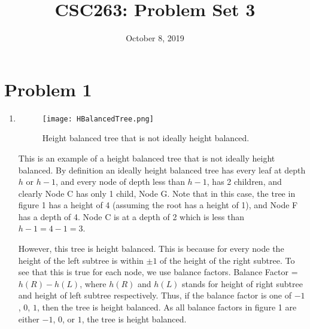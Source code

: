 \documentclass{article}
\title{CSC263: Problem Set 3}
\date{October 8, 2019}
\begin{document}
\maketitle

\section{Problem 1}

\begin{enumerate}[label=(\alph*)]

\item \begin{figure}[htp]
    \centering
    \texttt{[image: HBalancedTree.png]}
    \caption{Height balanced tree that is not ideally height balanced.}
    \label{fig:tree}
\end{figure}

This is an example of a height balanced tree that is not ideally height balanced. By definition an ideally height balanced tree has every leaf at depth $h$ or $h-1$, and every node of depth less than $h-1$, has 2 children, and clearly Node C has only 1 child, Node G. Note that in this case, the tree in figure 1 has a height of 4 (assuming the root has a height of 1), and Node F has a depth of 4. Node C is at a depth of 2 which is less than $h - 1 = 4 - 1 = 3$. 

However, this tree is height balanced. This is because for every node the height of the left subtree is within $\pm 1$ of the height of the right subtree. To see that this is true for each node, we use balance factors. Balance Factor = $h(R) - h(L)$, where $h(R)$ and $h(L)$ stands for height of right subtree and height of left subtree respectively. Thus, if the balance factor is one of $-1$, $0$, $1$, then the tree is height balanced. As all balance factors in figure 1 are either $-1$, $0$, or $1$, the tree is height balanced.

\end{enumerate}
\end{document}
